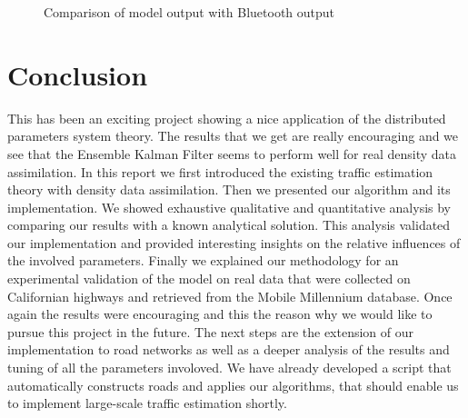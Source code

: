 \documentclass[letterpaper,10pt]{article}
\begin{document}
\begin{figure}
  \begin{center}
      
  \end{center}
  \caption{Comparison of model output with Bluetooth output}
  \label{fig:compModelBT}
\end{figure}

\newpage
\section*{Conclusion}

This has been an exciting project showing a nice application of the distributed parameters system theory. The results that we get are really encouraging and we see that the Ensemble Kalman Filter seems to perform well for real density data assimilation. In this report we first introduced the existing traffic estimation theory with density data assimilation. Then we presented our algorithm and its implementation. We showed exhaustive qualitative and quantitative analysis by comparing our results with a known analytical solution. This analysis validated our implementation and provided interesting insights on the relative influences of the involved parameters. Finally we explained our methodology for an experimental validation of the model on real data that were collected on Californian highways and retrieved from the Mobile Millennium database. Once again the results were encouraging and this the reason why we would like to pursue this project in the future. The next steps are the extension of our implementation to road networks as well as a deeper analysis of the results and tuning of all the parameters involoved. We have already developed a script that automatically constructs roads and applies our algorithms, that should enable us to implement large-scale traffic estimation shortly.

\newpage


\end{document}
